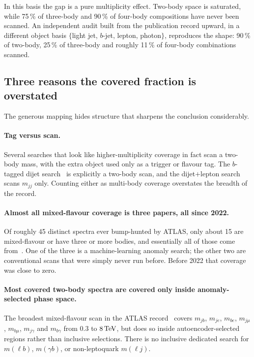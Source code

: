 In this basis the gap is a pure multiplicity effect. Two-body space is saturated, while 75\,\% of
three-body and 90\,\% of four-body compositions have never been scanned. An independent audit built
from the publication record upward, in a different object basis
$\{$light jet, $b$-jet, lepton, photon$\}$, reproduces the shape: 90\,\% of two-body, 25\,\% of
three-body and roughly 11\,\% of four-body combinations scanned.

\subsection{Three reasons the covered fraction is overstated}

The generous mapping hides structure that sharpens the conclusion considerably.

\paragraph{Tag versus scan.} Several searches that look like higher-multiplicity coverage in fact
scan a two-body mass, with the extra object used only as a trigger or flavour tag. The $b$-tagged
dijet search~\cite{atlas_btag_dijet} is explicitly a two-body scan, and the dijet$+$lepton
search~\cite{atlas_dijet_lepton} scans $m_{jj}$ only. Counting either as multi-body coverage
overstates the breadth of the record.

\paragraph{Almost all mixed-flavour coverage is three papers, all since 2022.} Of roughly 45
distinct spectra ever bump-hunted by ATLAS, only about 15 are mixed-flavour or have three or more
bodies, and essentially all of those come from~\cite{atlas_ml_anomaly, atlas_multibody,
atlas_boostedz}. One of the three is a machine-learning anomaly search; the other two are
conventional scans that were simply never run before. Before 2022 that coverage was close to zero.

\paragraph{Most covered two-body spectra are covered only inside anomaly-selected phase space.}
The broadest mixed-flavour scan in the ATLAS record~\cite{atlas_ml_anomaly} covers $m_{jb}$,
$m_{je}$, $m_{be}$, $m_{j\mu}$, $m_{b\mu}$, $m_{j\gamma}$ and $m_{b\gamma}$ from $0.3$ to $8\,\mathrm{TeV}$,
but does so inside autoencoder-selected regions rather than inclusive selections. There is no
inclusive dedicated search for $m(\ell b)$, $m(\gamma b)$, or non-leptoquark $m(\ell j)$.

